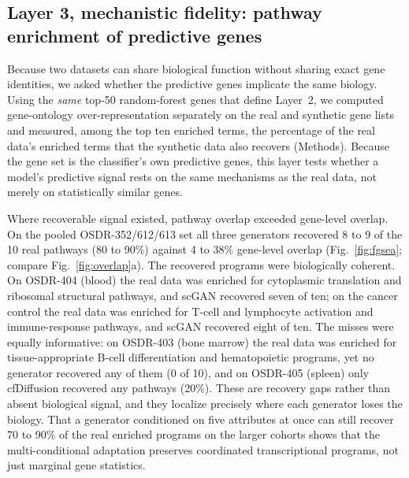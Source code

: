 \documentclass[11pt]{article}
\begin{document}
\subsection{Layer 3, mechanistic fidelity: pathway enrichment of predictive genes}
Because two datasets can share biological function without sharing exact gene identities, we asked whether the predictive genes implicate the same biology. Using the \emph{same} top-50 random-forest genes that define Layer~2, we computed gene-ontology over-representation separately on the real and synthetic gene lists and measured, among the top ten enriched terms, the percentage of the real data's enriched terms that the synthetic data also recovers (Methods). Because the gene set is the classifier's own predictive genes, this layer tests whether a model's predictive signal rests on the same mechanisms as the real data, not merely on statistically similar genes.

Where recoverable signal existed, pathway overlap exceeded gene-level overlap. On the pooled OSDR-352/612/613 set all three generators recovered 8 to 9 of the 10 real pathways (80 to 90\%) against 4 to 38\% gene-level overlap (Fig.~\ref{fig:fgsea}; compare Fig.~\ref{fig:overlap}a). The recovered programs were biologically coherent. On OSDR-404 (blood) the real data was enriched for cytoplasmic translation and ribosomal structural pathways, and scGAN recovered seven of ten; on the cancer control the real data was enriched for T-cell and lymphocyte activation and immune-response pathways, and scGAN recovered eight of ten. The misses were equally informative: on OSDR-403 (bone marrow) the real data was enriched for tissue-appropriate B-cell differentiation and hematopoietic programs, yet no generator recovered any of them (0 of 10), and on OSDR-405 (spleen) only cfDiffusion recovered any pathways (20\%). These are recovery gaps rather than absent biological signal, and they localize precisely where each generator loses the biology. That a generator conditioned on five attributes at once can still recover 70 to 90\% of the real enriched programs on the larger cohorts shows that the multi-conditional adaptation preserves coordinated transcriptional programs, not just marginal gene statistics.
\end{document}
